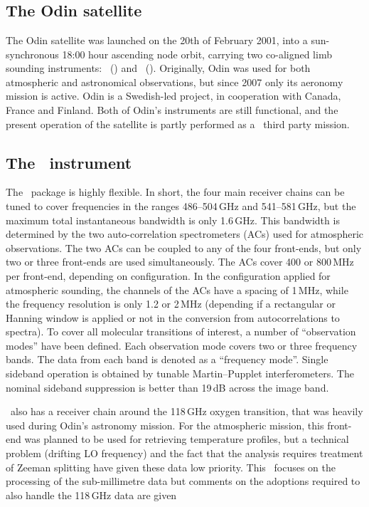 \section{\smr}
\label{sec:smr}
%
\subsection{The Odin satellite}
\label{sec:odin}
%
The Odin satellite was launched on the 20th of February 2001, into a sun-synchronous
18:00 hour ascending node orbit, carrying two co-aligned limb sounding
instruments: \OSIRIS\ (\OSIRISlong) and
\SMR\ (\SMRlong). Originally, Odin was used for both
atmospheric and astronomical observations, but since 2007 only its aeronomy
mission is active. Odin is a Swedish-led project, in cooperation with Canada,
France and Finland. Both of Odin's instruments are still functional, and the
present operation of the satellite is partly performed as a \ESA\ third party
mission.


\subsection{The \SMR\ instrument}
\label{sec:smr:details}
%
The \smr\ package is highly flexible. In short, the four main receiver chains
can be tuned to cover frequencies in the ranges 486--504\,GHz and
541--581\,GHz, but the maximum total instantaneous bandwidth is only 1.6\,GHz.
This bandwidth is determined by the two auto-correlation spectrometers (ACs)
used for atmospheric observations. The two ACs can be coupled to any of the
four front-ends, but only two or three front-ends are used simultaneously. The
ACs cover 400 or 800\,MHz per front-end, depending on configuration. In the
configuration applied for atmospheric sounding, the channels of the ACs have a
spacing of 1\,MHz, while the frequency resolution is only 1.2 or 2\,MHz
(depending if a rectangular or Hanning window is applied or not in the
conversion from autocorrelations to spectra). To cover all molecular
transitions of interest, a number of ``observation modes'' have been defined.
Each observation mode covers two or three frequency bands. The data from each
band is denoted as a ``frequency mode''. Single sideband operation is obtained
by tunable Martin--Pupplet interferometers. The nominal sideband suppression is
better than 19\,dB across the image band.

\smr\ also has a receiver chain around the 118\,GHz oxygen transition, that was
heavily used during Odin's astronomy mission. For the atmospheric mission, this
front-end was planned to be used for retrieving temperature profiles, but a
technical problem (drifting LO frequency) and the fact that the analysis
requires treatment of Zeeman splitting have given these data low priority. This
\ATBD\ focuses on the processing of the sub-millimetre data but comments on the
adoptions required to also handle the 118\,GHz data are given

